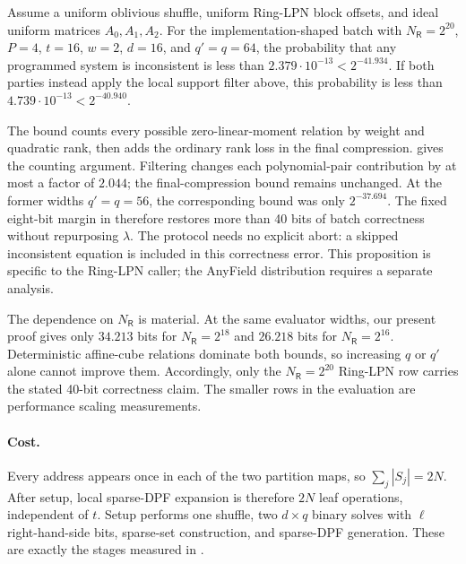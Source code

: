 \begin{proposition}\label{prop:rc-ringlpn-correctness}
Assume a uniform oblivious shuffle, uniform Ring-LPN block offsets, and ideal
uniform matrices $A_0,A_1,A_2$.  For the implementation-shaped batch with
$N_{\mathsf R}=2^{20}$, $P=4$, $t=16$, $w=2$, $d=16$, and $q'=q=64$, the
probability that any programmed system is inconsistent is less than
$2.379\cdot10^{-13}<2^{-41.934}$.  If both parties instead apply the local
support filter above, this probability is less than
$4.739\cdot10^{-13}<2^{-40.940}$.
\end{proposition}
The bound counts every possible zero-linear-moment relation by weight and
quadratic rank, then adds the ordinary rank loss in the final compression.
 gives the counting argument.  Filtering changes
each polynomial-pair contribution by at most a factor of $2.044$; the
final-compression bound remains unchanged.  At the former
widths $q'=q=56$, the corresponding bound was only $2^{-37.694}$.  The fixed
eight-bit margin in  therefore restores more
than 40 bits of batch correctness without repurposing $\lambda$.  The
protocol needs no explicit abort: a skipped inconsistent equation is included
in this correctness error.  This proposition is specific to the Ring-LPN
caller; the AnyField distribution requires a separate analysis.

The dependence on $N_{\mathsf R}$ is material.  At the same evaluator widths,
our present proof gives only $34.213$ bits for $N_{\mathsf R}=2^{18}$ and
$26.218$ bits for $N_{\mathsf R}=2^{16}$.  Deterministic affine-cube relations
dominate both bounds, so increasing $q$ or $q'$ alone cannot improve them.
Accordingly, only the $N_{\mathsf R}=2^{20}$ Ring-LPN row carries the stated
40-bit correctness claim.  The smaller rows in the evaluation are performance
scaling measurements.

\paragraph{Cost.}
Every address appears once in each of the two partition maps, so
$\sum_j|S_j|=2N$.  After setup, local sparse-DPF expansion is therefore $2N$
leaf operations, independent of $t$.  Setup performs one shuffle, two
$d\times q$ binary solves with $\ell$ right-hand-side bits, sparse-set
construction, and sparse-DPF generation.  These are exactly the stages
measured in .


